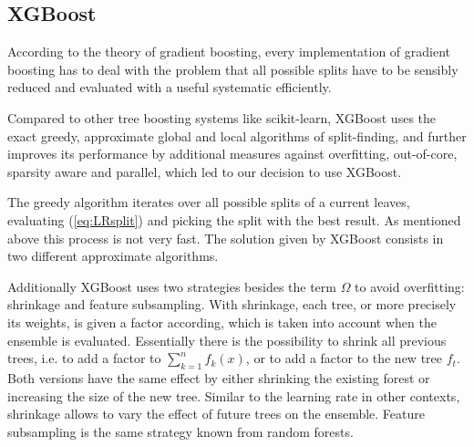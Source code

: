 \subsection{XGBoost}

According to the theory of gradient boosting, every implementation of gradient boosting has to deal with the problem that all possible splits have to be sensibly reduced and evaluated with a useful systematic  efficiently.

Compared to other tree boosting systems like scikit-learn, XGBoost uses the exact greedy, approximate global and local algorithms of split-finding, and further improves its performance by additional measures against overfitting, out-of-core, sparsity aware and parallel, which led to our decision to use XGBoost.

The greedy algorithm iterates over all possible splits of a current leaves, evaluating (\ref{eq:LRsplit}) and picking the split with the best result. As mentioned above this process is not very fast. The solution given by XGBoost consists in two different approximate algorithms.

Additionally XGBoost uses two strategies besides the term $\Omega$ to avoid overfitting: shrinkage and feature subsampling. With shrinkage, each tree, or more precisely its weights, is given a factor according, which is taken into account when the ensemble is evaluated. Essentially there is the possibility to shrink all previous trees, i.e. to add a factor to $\sum\limits_{k=1}^n f_k(x)$, or to add a factor to the new tree $f_t$. Both versions have the same effect by either shrinking the existing forest or increasing the size of the new tree. Similar to the learning rate in other contexts, shrinkage allows to vary the effect of future trees on the ensemble. Feature subsampling is the same strategy known from random forests.

